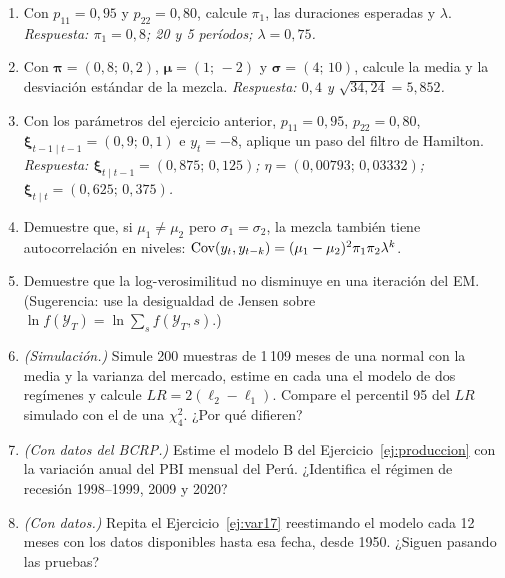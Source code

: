 \begin{enumerate}[label=\textbf{\thechapter.\arabic*},leftmargin=*,itemsep=6pt]
  \item Con $p_{11}=0{,}95$ y $p_{22}=0{,}80$, calcule $\pi_1$, las duraciones esperadas y $\lambda$. \textit{Respuesta: $\pi_1=0{,}8$;
  20 y 5 períodos; $\lambda=0{,}75$.}

  \item Con $\boldsymbol\pi=(0{,}8;\,0{,}2)$, $\boldsymbol\mu=(1;\,-2)$ y $\boldsymbol\sigma=(4;\,10)$, calcule la media y la desviación estándar de
  la mezcla. \textit{Respuesta: $0{,}4$ y $\sqrt{34{,}24}=5{,}852$.}

  \item Con los parámetros del ejercicio anterior, $p_{11}=0{,}95$, $p_{22}=0{,}80$, $\boldsymbol\xi_{t-1\mid t-1}=(0{,}9;\,0{,}1)$ e
  $y_t=-8$, aplique un paso del filtro de Hamilton. \textit{Respuesta: $\boldsymbol\xi_{t\mid t-1}=(0{,}875;\,0{,}125)$;
  $\eta=(0{,}00793;\,0{,}03332)$; $\boldsymbol\xi_{t\mid t}=(0{,}625;\,0{,}375)$.}

  \item Demuestre que, si $\mu_1\neq\mu_2$ pero $\sigma_1=\sigma_2$, la mezcla también tiene autocorrelación en niveles:
  $\operatorname{Cov}(y_t,y_{t-k})=(\mu_1-\mu_2)^2\pi_1\pi_2\lambda^k$.

  \item Demuestre que la log-verosimilitud no disminuye en una iteración del EM. (Sugerencia: use la desigualdad de Jensen
  sobre $\ln f(\mathcal Y_T)=\ln\sum_{s}f(\mathcal Y_T,s)$.)

  \item \emph{(Simulación.)} Simule 200 muestras de 1\,109 meses de una normal con la media y la varianza del mercado, estime
  en cada una el modelo de dos regímenes y calcule $LR=2(\ell_2-\ell_1)$. Compare el percentil 95 del $LR$ simulado con el de
  una $\chi^2_4$. ¿Por qué difieren?

  \item \emph{(Con datos del BCRP.)} Estime el modelo B del Ejercicio~\ref{ej:produccion} con la variación anual del PBI mensual
  del Perú. ¿Identifica el régimen de recesión 1998--1999, 2009 y 2020?

  \item \emph{(Con datos.)} Repita el Ejercicio~\ref{ej:var17} reestimando el modelo cada 12 meses con los datos disponibles hasta
  esa fecha, desde 1950. ¿Siguen pasando las pruebas?
\end{enumerate}

